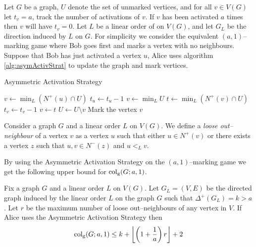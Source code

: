 \begin{definition} 
    Let $G$ be a graph, $U$ denote the set of unmarked vertices, and for all $v\in V(G)$ let $t_v=a$, track the number of activations of $v$. If $v$ has been activated $a$ times then $v$ will have $t_v=0$. Let $L$ be a linear order of on $V(G)$, and let $G_L$ be the direction induced  by $L$ on $G$. %
    For simplicity we consider the equivalent $(a,1)$--marking game where Bob goes first and marks a vertex with no neighbours. Suppose that Bob has just activated a vertex $u$, Alice uses algorithm \ref{alg:asymActivStrat} to update the graph and mark vertices.
    \begin{algorithm}[h]
        \caption{Asymmetric Activation Strategy}
        \label{alg:asymActivStrat}
        \begin{algorithmic}[1]
            \Statex
                    \State $v\gets \min_L (N^+(u)\cap U)$ %
                    \State $t_u \gets t_u-1$
                    \Else 
                    \State $v\gets \min_L U$                  
                \EndIf
                    \State $t\gets \min_L (N^+(v)\cap U)$ %
                    \State $t_v \gets t_v-1$
                    \State $v\gets t$
                \EndWhile
                \State $U \gets U \setminus v$
                \State Mark the vertex $v$
            \EndFor
        \end{algorithmic}
    \end{algorithm}
\end{definition}


Consider a graph $G$ and a linear order $L$ on $V(G)$. We define a \textit{loose out--neighbour} of a vertex $v$ as a vertex $u$ such that either $u\in N^+(v)$ or there exists a vertex $z$ such that $u,v\in N^-(z)$ and $u<_L v$.

By using the Asymmetric Activation Strategy on the $(a,1)$--marking game we get the following upper bound for $\operatorname{col_g}(G;a,1)$.

\begin{theorem}
    Fix a graph $G$ and a linear order $L$ on $V(G)$. Let $G_L=(V,E)$ be the directed graph induced by the linear order $L$ on the graph $G$ such that $\Delta^+(G_L)=k>a$. Let $r$ be the maximum number of loose out--neighbours of any vertex in $V$. If Alice uses the Asymmetric Activation Strategy then \[\operatorname{col_g}(G;a,1)\leq k+\left\lfloor \left(1+\frac{1}{a}\right)r \right\rfloor +2\]
\end{theorem}

